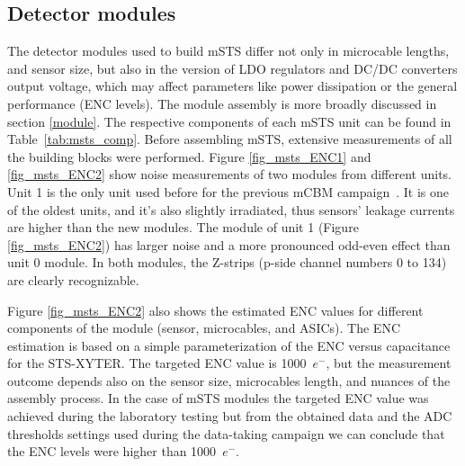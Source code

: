 \subsection{Detector modules}
 The detector modules used to build \gls{mSTS} differ not only in microcable lengths, and sensor size, but also in the version of \gls{LDO} regulators and DC/DC converters output voltage, which may affect parameters like power dissipation or the general performance (ENC levels). The module assembly is more broadly discussed in section \ref{module}. The respective components of each \gls{mSTS} unit can be found in Table~\ref{tab:msts_comp}. Before assembling \gls{mSTS}, extensive measurements of all the building blocks were performed. Figure \ref{fig_msts_ENC1} and  \ref{fig_msts_ENC2} show noise measurements of two modules from different units. Unit 1 is the only unit used before for the previous \gls{mCBM} campaign~\cite{heuser1}. It is one of the oldest units, and it's also slightly irradiated, thus sensors' leakage currents are higher than the new modules. The module of unit 1 (Figure \ref{fig_msts_ENC2}) has larger noise and a more pronounced odd-even effect than unit 0 module. In both modules, the Z-strips (p-side channel numbers 0 to 134) are clearly recognizable. 

Figure \ref{fig_msts_ENC2} also shows the estimated ENC values for different components of the module (sensor, microcables, and \gls{ASIC}s). The \gls{ENC} estimation is based on a simple parameterization of the \gls{ENC} versus capacitance for the STS-XYTER. The targeted \gls{ENC} value is 1000~$e^{-}$, but the measurement outcome depends also on the sensor size, microcables length, and nuances of the assembly process. In the case of \gls{mSTS} modules the targeted \gls{ENC} value was achieved during the laboratory testing but from the obtained data and the \gls{ADC} thresholds settings used during the data-taking campaign we can conclude that the \gls{ENC} levels were higher than 1000~$e^{-}$.\newpage


